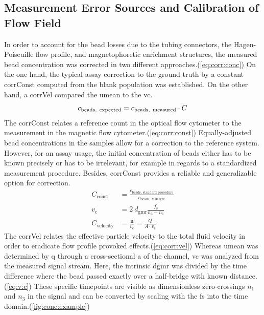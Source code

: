 \clearpage
\subsection{Measurement Error Sources and Calibration of Flow Field}
\label{sec:res:Correction}
In order to account for the bead losses due to the tubing connectors, the Hagen-Poiseuille flow profile, and magnetophoretic enrichment structures, the measured bead concentration was corrected in two different approaches.(\cref{eq:corr:conc}) On the one hand, the typical assay correction to the ground truth by a constant \gls{corrConst} computed from the blank population was established. On the other hand, a \gls{corrVel} compared the \acrfull{umean} to the \gls{vc}.
\begin{equation}	
	c_\text{beads,\, expected} = c_\text{beads,\, measured}  \cdot C \label{eq:corr:conc}
\end{equation}
The \gls{corrConst} relates a reference count in the optical flow cytometer to the measurement in the magnetic flow cytometer.(\cref{eq:corr:const}) Equally-adjusted bead concentrations in the samples allow for a correction to the reference system. However, for an assay usage, the initial concentration of beads either has to be known precisely or has to be irrelevant, for example in regards to a standardized measurement procedure. Besides, \gls{corrConst} provides a reliable and generalizable option for correction. 
\begin{align}
	C_\text{const} &= \frac{c_\text{beads, standard procedure}}{c_\text{beads, MRCyte}} \label{eq:corr:const}\\
	v_\text{c} &= 2\ d_\text{gmr} \frac{f_\text{s}}{n_\text{3}-n_\text{1}} \label{eq:v:c} \\
	C_\text{velocity} &= \frac{\overline{\mathbf{u}}}{v_\text{c}} = \frac{Q}{A \cdot v_\text{c}} \label{eq:corr:vel} 
\end{align}
The \gls{corrVel} relates the effective particle velocity to the total fluid velocity in order to eradicate flow profile provoked effects.(\cref{eq:corr:vel}) Whereas \gls{umean} was determined by \acrfull{q} through a cross-sectional \gls{a} of the channel, \gls{vc} was analyzed from the measured signal stream. Here, the intrinsic \acrfull{dgmr} was divided by the time difference where the bead passed exactly over a half-bridge with known distance.(\cref{eq:v:c}) These specific timepoints are visible as dimensionless zero-crossings $n_\text{1}$ and $n_\text{3}$ in the signal and can be converted by scaling with the \acrfull{fs} into the time domain.(\cref{fig:conc:example})
